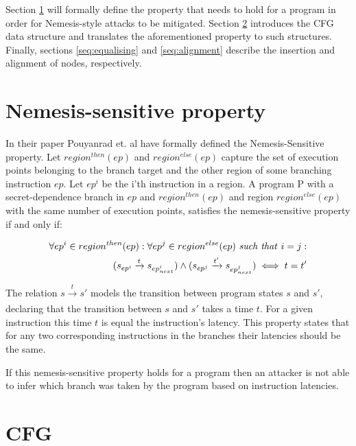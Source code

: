 Section \ref{sec:property} will formally define the property that needs to hold for a program in order for Nemesis-style attacks to be mitigated. Section \ref{sec:cfg} 
introduces the CFG data structure and translates the aforementioned property to such structures. Finally, sections \ref{seq:equalising} and \ref{seq:alignment} describe the insertion and alignment of nodes, respectively. 

\section{Nemesis-sensitive property}\label{sec:property}
In their paper Pouyanrad et. al have formally defined the Nemesis-Sensitive property.  Let $region^{then}(ep)$ and $region^{else}(ep)$ capture the set of execution points belonging to the branch target and the other region of some branching instruction $ep$. Let $ep^i$ be the i'th instruction in a region. A program P with a secret-dependence branch in $ep$ and $region^{then}(ep)$ 
and region $region^{else}(ep)$ with the same number of execution points, satisfies the nemesis-sensitive property if and only if:  

\begin{equation} \label{eq:nemesisProperty}
    \begin{split}
    \forall ep^i \in region^{then}(ep) : \forall ep^j \in region^{else}(ep) \text{ \textit{such that} } i=j :  \\ 
    (s_{ep^i} \xrightarrow[]{t} s_{ep^i_{next}}) \land (s_{ep^j} \xrightarrow[]{t'} s_{ep^j_{next}}) \iff t = t' \\ 
    \end{split}
\end{equation}
\cite{MSP430Detection}

The relation $s \xrightarrow[]{t} s'$ models the transition between program states $s$ and $s'$, declaring that the transition between $s$ and $s'$ takes a time $t$. 
For a given instruction this time $t$ is equal the instruction's latency. This property states that for any two corresponding instructions in the branches their latencies should be the same.

If this nemesis-sensitive property holds for a program then an attacker is not able to infer which branch was taken by the program based on instruction latencies.

\section{CFG}\label{sec:cfg}

